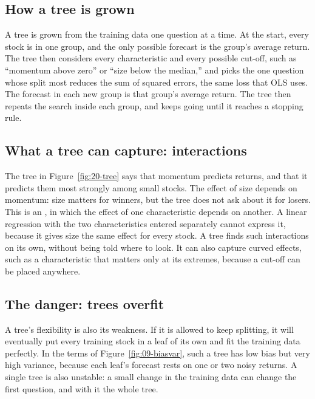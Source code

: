\subsection{How a tree is grown}

A tree is grown from the training data one question at a time. At the start, every stock is in one group, and the only possible forecast is the group's average return. The tree then considers every characteristic and every possible cut-off, such as ``momentum above zero'' or ``size below the median,'' and picks the one question whose split most reduces the sum of squared errors, the same loss that OLS uses. The forecast in each new group is that group's average return. The tree then repeats the search inside each group, and keeps going until it reaches a stopping rule.

\subsection{What a tree can capture: interactions}

The tree in Figure~\ref{fig:20-tree} says that momentum predicts returns, and that it predicts them most strongly among small stocks. The effect of size depends on momentum: size matters for winners, but the tree does not ask about it for losers. This is an , in which the effect of one characteristic depends on another. A linear regression with the two characteristics entered separately cannot express it, because it gives size the same effect for every stock. A tree finds such interactions on its own, without being told where to look. It can also capture curved effects, such as a characteristic that matters only at its extremes, because a cut-off can be placed anywhere.

\subsection{The danger: trees overfit}

A tree's flexibility is also its weakness. If it is allowed to keep splitting, it will eventually put every training stock in a leaf of its own and fit the training data perfectly. In the terms of Figure~\ref{fig:09-biasvar}, such a tree has low bias but very high variance, because each leaf's forecast rests on one or two noisy returns. A single tree is also unstable: a small change in the training data can change the first question, and with it the whole tree.

